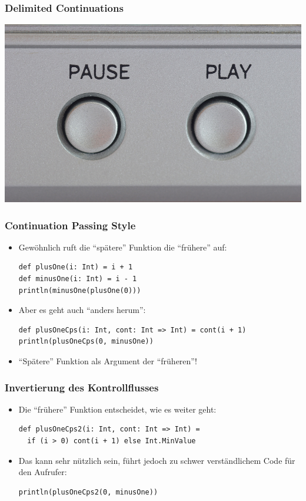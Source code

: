 \documentclass{beamer}
\begin{document}
\begin{frame}
  \frametitle{Delimited Continuations}
  \includegraphics[width=\linewidth]{img/continue.jpg}
\end{frame}

\begin{frame}[fragile]
  \frametitle{Continuation Passing Style}
  \begin{itemize}
    \item Gew\"ohnlich ruft die "`sp\"atere"' Funktion die "`fr\"uhere"' auf:
    \begin{lstlisting}
def plusOne(i: Int) = i + 1
def minusOne(i: Int) = i - 1
println(minusOne(plusOne(0)))
    \end{lstlisting}
    \item Aber es geht auch "`anders herum"':
    \begin{lstlisting}
def plusOneCps(i: Int, cont: Int => Int) = cont(i + 1)
println(plusOneCps(0, minusOne))
    \end{lstlisting}
    \item "`Sp\"atere"' Funktion als Argument der "`fr\"uheren"'!
  \end{itemize}
\end{frame}

\begin{frame}[fragile]
  \frametitle{Invertierung des Kontrollflusses}
  \begin{itemize}
    \item Die "`fr\"uhere"' Funktion entscheidet, wie es weiter geht:
    \begin{lstlisting}
def plusOneCps2(i: Int, cont: Int => Int) =
  if (i > 0) cont(i + 1) else Int.MinValue
    \end{lstlisting}
    \item Das kann sehr n\"utzlich sein, f\"uhrt jedoch zu schwer verst\"andlichem Code f\"ur den Aufrufer:
    \begin{lstlisting}
println(plusOneCps2(0, minusOne))
    \end{lstlisting}
  \end{itemize}
\end{frame}
\end{document}
